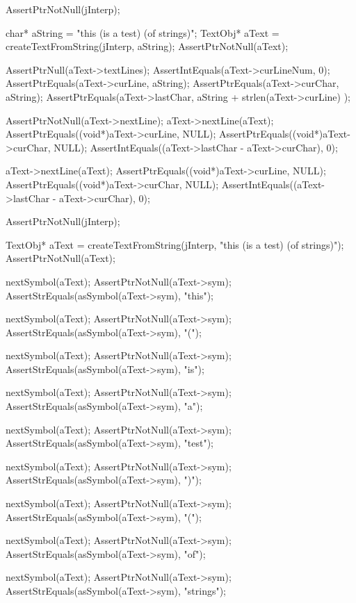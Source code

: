 \startCTest
  AssertPtrNotNull(jInterp);

  char* aString = "this (is a test) (of strings)";
  TextObj* aText = createTextFromString(jInterp, aString);
  AssertPtrNotNull(aText);

  AssertPtrNull(aText->textLines);
  AssertIntEquals(aText->curLineNum, 0);
  AssertPtrEquals(aText->curLine, aString);
  AssertPtrEquals(aText->curChar, aString);
  AssertPtrEquals(aText->lastChar,
    aString + strlen(aText->curLine)
  );
  
  AssertPtrNotNull(aText->nextLine);
  aText->nextLine(aText);
  AssertPtrEquals((void*)aText->curLine, NULL);
  AssertPtrEquals((void*)aText->curChar, NULL);
  AssertIntEquals((aText->lastChar - aText->curChar), 0);

  aText->nextLine(aText);
  AssertPtrEquals((void*)aText->curLine, NULL);
  AssertPtrEquals((void*)aText->curChar, NULL);
  AssertIntEquals((aText->lastChar - aText->curChar), 0);
\stopCTest
\stopTestCase

\startCTest
  AssertPtrNotNull(jInterp);

  TextObj* aText =
    createTextFromString(jInterp, "this (is a test) (of strings)");
  AssertPtrNotNull(aText);

  nextSymbol(aText);
  AssertPtrNotNull(aText->sym);
  AssertStrEquals(asSymbol(aText->sym), "this");

  nextSymbol(aText);
  AssertPtrNotNull(aText->sym);
  AssertStrEquals(asSymbol(aText->sym), "(");

  nextSymbol(aText);
  AssertPtrNotNull(aText->sym);
  AssertStrEquals(asSymbol(aText->sym), "is");

  nextSymbol(aText);
  AssertPtrNotNull(aText->sym);
  AssertStrEquals(asSymbol(aText->sym), "a");

  nextSymbol(aText);
  AssertPtrNotNull(aText->sym);
  AssertStrEquals(asSymbol(aText->sym), "test");

  nextSymbol(aText);
  AssertPtrNotNull(aText->sym);
  AssertStrEquals(asSymbol(aText->sym), ")");

  nextSymbol(aText);
  AssertPtrNotNull(aText->sym);
  AssertStrEquals(asSymbol(aText->sym), "(");

  nextSymbol(aText);
  AssertPtrNotNull(aText->sym);
  AssertStrEquals(asSymbol(aText->sym), "of");

  nextSymbol(aText);
  AssertPtrNotNull(aText->sym);
  AssertStrEquals(asSymbol(aText->sym), "strings");

